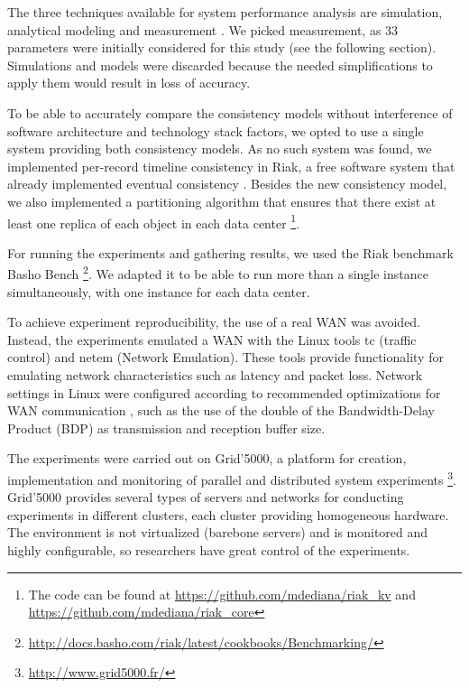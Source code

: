 \documentclass[man,floatsintext,12pt]{apa6}
\begin{document}
The three techniques available for system performance analysis are simulation,
analytical modeling and measurement \parencite{Jain1991}. We picked measurement, as
33 parameters were initially considered for this study (see the following
section). Simulations and models were discarded because the needed
simplifications to apply them would result in loss of accuracy.

To be able to accurately compare the consistency models without interference of
software architecture and technology stack factors, we opted to use a single
system providing both consistency models. As no such system was found, we
implemented per-record timeline consistency in Riak, a free software system
that already implemented eventual consistency \parencite{Riak2013}. Besides the
new consistency model, we also implemented a partitioning algorithm that
ensures that there exist at least one replica of each object in each data
center \footnote{The code can be found at
\url{https://github.com/mdediana/riak_kv} and
\url{https://github.com/mdediana/riak_core}}.

For running the experiments and gathering results, we used the Riak benchmark
Basho Bench \footnote{\url{http://docs.basho.com/riak/latest/cookbooks/Benchmarking/}}.
We adapted it to be able to run more than a single instance simultaneously,
with one instance for each data center.

To achieve experiment reproducibility, the use of a real WAN was avoided.
Instead, the experiments emulated a WAN with the Linux tools tc (traffic
control) and netem (Network Emulation). These tools provide functionality for
emulating network characteristics such as latency and packet loss. Network
settings in Linux were configured according to recommended optimizations for
WAN communication \parencite{ESnet2012}, such as the use of the double of the
Bandwidth-Delay Product (BDP) as transmission and reception buffer size.

The experiments were carried out on Grid'5000, a platform for creation,
implementation and monitoring of parallel and distributed system experiments
\footnote{\url{http://www.grid5000.fr/}}. Grid'5000 provides several types of
servers and networks for conducting experiments in different clusters, each
cluster providing homogeneous hardware. The environment is not virtualized
(barebone servers) and is monitored and highly configurable, so researchers
have great control of the experiments.
\end{document}
